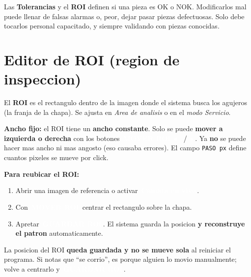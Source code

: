 \documentclass[11pt,a4paper]{article}
\newcommand{\btn}[1]{\colorbox{ink}{\textcolor{white}{\small\,\textbf{#1}\,}}}
\begin{document}
\begin{dangerbox}
Las \textbf{Tolerancias} y el \textbf{ROI} definen si una pieza es OK o NOK.
Modificarlos mal puede llenar de falsas alarmas o, peor, dejar pasar piezas
defectuosas. Solo debe tocarlos personal capacitado, y siempre validando con
piezas conocidas.
\end{dangerbox}

\section{Editor de ROI (region de inspeccion)}
El \textbf{ROI} es el rectangulo dentro de la imagen donde el sistema busca
los agujeros (la franja de la chapa). Se ajusta en \emph{Area de analisis} o
en el \emph{modo Servicio}.

\begin{infobox}
\textbf{Ancho fijo:} el ROI tiene un \textbf{ancho constante}. Solo se puede
\textbf{mover a izquierda o derecha} con los botones \btn{MOVER ROI $\blacktriangleleft$}
\ / \btn{$\blacktriangleright$}. Ya \textbf{no} se puede hacer mas ancho ni mas
angosto (eso causaba errores). El campo \texttt{PASO px} define cuantos pixeles
se mueve por click.
\end{infobox}

\textbf{Para reubicar el ROI:}
\begin{enumerate}[leftmargin=1.5em]
  \item Abrir una imagen de referencia o activar \btn{Camara en vivo}.
  \item Con \btn{MOVER ROI} centrar el rectangulo sobre la chapa.
  \item Apretar \btn{GUARDAR ROI}. El sistema guarda la posicion \textbf{y
        reconstruye el patron} automaticamente.
\end{enumerate}

\begin{warnbox}
La posicion del ROI \textbf{queda guardada y no se mueve sola} al reiniciar el
programa. Si notas que ``se corrio'', es porque alguien lo movio manualmente;
volve a centrarlo y \btn{GUARDAR ROI}.
\end{warnbox}

\end{document}
